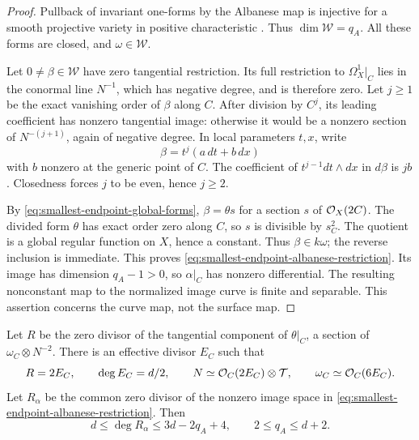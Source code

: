 \begin{proof}
Pullback of invariant one-forms by the Albanese map is injective
for a smooth projective variety in positive characteristic
\cite[Lemma~1.3 and its proof, p.~195]{MehtaSrinivasAlbanese}.
Thus $\dim\mathcal W=q_A$.
All these forms are closed, and $\omega\in\mathcal W$.

Let $0\ne\beta\in\mathcal W$ have zero tangential restriction.
Its full restriction to $\Omega_X^1|_C$ lies in the conormal line
$N^{-1}$, which has negative degree, and is therefore zero.
Let $j\ge1$ be the exact vanishing order of $\beta$ along $C$.
After division by $C^j$, its leading coefficient has nonzero
tangential image: otherwise it would be a nonzero section of
$N^{-(j+1)}$, again of negative degree.
In local parameters $t,x$, write
\[
 \beta=t^j(a\,dt+b\,dx)
\]
with $b$ nonzero at the generic point of $C$.
The coefficient of $t^{j-1}dt\wedge dx$ in $d\beta$ is $jb$.
Closedness forces $j$ to be even, hence $j\ge2$.

By \eqref{eq:smallest-endpoint-global-forms},
$\beta=\theta s$ for a section $s$ of $\mathcal O_X(2C)$.
The divided form $\theta$ has exact order zero along $C$,
so $s$ is divisible by $s_C^2$.
The quotient is a global regular function on $X$, hence a constant.
Thus $\beta\in k\omega$; the reverse inclusion is immediate.
This proves \eqref{eq:smallest-endpoint-albanese-restriction}.
Its image has dimension $q_A-1>0$, so $\alpha|_C$ has nonzero
differential.  The resulting nonconstant map to the normalized
image curve is finite and separable.
This assertion concerns the curve map, not the surface map.
\end{proof}

\begin{proposition}
\label{prop:smallest-endpoint-albanese-dimension}
Let $R$ be the zero divisor of the tangential component of
$\theta|_C$, a section of $\omega_C\otimes N^{-2}$.
There is an effective divisor $E_C$ such that
\begin{equation}\label{eq:smallest-endpoint-albanese-curve-lines}
 R=2E_C,\qquad \deg E_C=d/2,\qquad
 N\simeq\mathcal O_C(2E_C)\otimes\mathcal T,\qquad
 \omega_C\simeq\mathcal O_C(6E_C).
\end{equation}
Let $R_\alpha$ be the common zero divisor of the nonzero image
space in \eqref{eq:smallest-endpoint-albanese-restriction}.
Then
\begin{equation}\label{eq:smallest-endpoint-albanese-dimension}
 d\le\deg R_\alpha\le3d-2q_A+4,\qquad
 2\le q_A\le d+2.
\end{equation}
\end{proposition}

